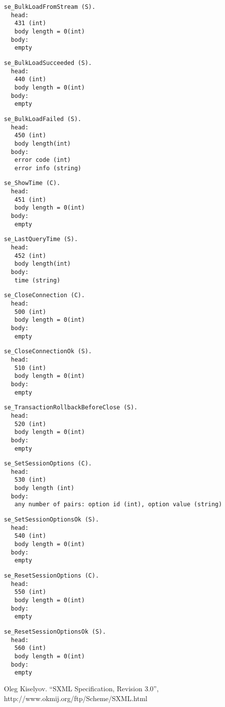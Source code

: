 \documentclass[a4paper,12pt]{article}
\begin{document}
\begin{verbatim}
se_BulkLoadFromStream (S).
  head:
   431 (int)
   body length = 0(int)
  body:
   empty
\end{verbatim}

\begin{verbatim}
se_BulkLoadSucceeded (S).
  head:
   440 (int)
   body length = 0(int)
  body:
   empty
\end{verbatim}

\begin{verbatim}
se_BulkLoadFailed (S).
  head:
   450 (int)
   body length(int)
  body:
   error code (int)
   error info (string)
\end{verbatim}

\begin{verbatim}
se_ShowTime (C).
  head:
   451 (int)
   body length = 0(int)
  body:
   empty
\end{verbatim}

\begin{verbatim}
se_LastQueryTime (S).
  head:
   452 (int)
   body length(int)
  body:
   time (string)
\end{verbatim}

\begin{verbatim}
se_CloseConnection (C).
  head:
   500 (int)
   body length = 0(int)
  body:
   empty
\end{verbatim}

\begin{verbatim}
se_CloseConnectionOk (S).
  head:
   510 (int)
   body length = 0(int)
  body:
   empty
\end{verbatim}

\begin{verbatim}
se_TransactionRollbackBeforeClose (S).
  head:
   520 (int)
   body length = 0(int)
  body:
   empty
\end{verbatim}

\begin{verbatim}
se_SetSessionOptions (C).
  head:
   530 (int)
   body length (int)
  body:
   any number of pairs: option id (int), option value (string)
\end{verbatim}

\begin{verbatim}
se_SetSessionOptionsOk (S).
  head:
   540 (int)
   body length = 0(int)
  body:
   empty
\end{verbatim}

\begin{verbatim}
se_ResetSessionOptions (C).
  head:
   550 (int)
   body length = 0(int)
  body:
   empty
\end{verbatim}

\begin{verbatim}
se_ResetSessionOptionsOk (S).
  head:
   560 (int)
   body length = 0(int)
  body:
   empty
\end{verbatim}

\begin{thebibliography}{1}

Oleg Kiselyov.
``SXML Specification, Revision 3.0'',
http://www.okmij.org/ftp/Scheme/SXML.html
\end{thebibliography}
\end{document}
